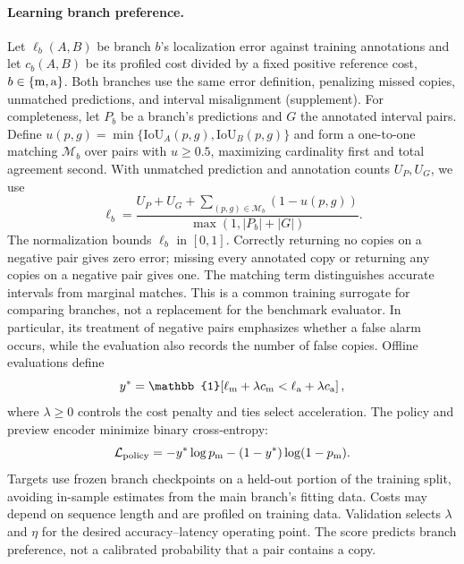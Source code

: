 \paragraph{Learning branch preference.}
Let $\ell_b(A,B)$ be branch $b$'s localization error against training annotations and let
$c_b(A,B)$ be its profiled cost divided by a fixed positive reference cost,
$b\in\{{\rm m},{\rm a}\}$. Both branches use the same error definition, penalizing missed
copies, unmatched predictions, and interval misalignment (supplement).
For completeness, let $P_b$ be a branch's predictions and $G$ the annotated interval pairs.
Define $u(p,g)=\min\{\mathrm{IoU}_A(p,g),\mathrm{IoU}_B(p,g)\}$ and form a one-to-one
matching $\mathcal M_b$ over pairs with $u\ge0.5$, maximizing cardinality first and total
agreement second. With unmatched prediction and annotation counts $U_P,U_G$, we use
\begin{equation}
\ell_b=\frac{U_P+U_G+\sum_{(p,g)\in\mathcal M_b}(1-u(p,g))}
{\max(1,|P_b|+|G|)}.
\label{eq:branch-error}
\end{equation}
The normalization bounds $\ell_b$ in $[0,1]$. Correctly returning no copies on a negative
pair gives zero error; missing every annotated copy or returning any copies on a negative
pair gives one. The matching term distinguishes accurate intervals from marginal matches.
This is a common training surrogate for comparing branches, not a replacement for the
benchmark evaluator. In particular, its treatment of negative pairs emphasizes whether a
false alarm occurs, while the evaluation also records the number of false copies.
Offline evaluations define
\begin{equation}
y^*=\mathbb{1}\!\left[\ell_{\rm m}+\lambda c_{\rm m}
<\ell_{\rm a}+\lambda c_{\rm a}\right],
\label{eq:policy-target}
\end{equation}
where $\lambda\ge0$ controls the cost penalty and ties select acceleration. The policy and
preview encoder minimize binary cross-entropy:
\begin{equation}
\mathcal L_{\rm policy}=-y^*\log p_{\rm m}-(1-y^*)\log(1-p_{\rm m}).
\label{eq:policy-loss}
\end{equation}
Targets use frozen branch checkpoints on a held-out portion of the training split, avoiding
in-sample estimates from the main branch's fitting data. Costs may depend on sequence length
and are profiled on training data. Validation selects $\lambda$ and $\eta$ for the desired
accuracy--latency operating point. The score predicts branch preference, not a calibrated
probability that a pair contains a copy.

